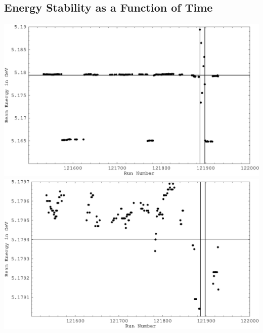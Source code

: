 \documentclass[12pt]{article}
\begin{document}
\begin{center}

\section*{Energy Stability as a Function of Time}

\vfill
\includegraphics[width=\linewidth]{energy_vs_time.tex_gr1.eps}
\vfill
\includegraphics[width=\linewidth]{energy_vs_time.tex_gr2.eps}
\vfill

\end{center}
\end{document}
